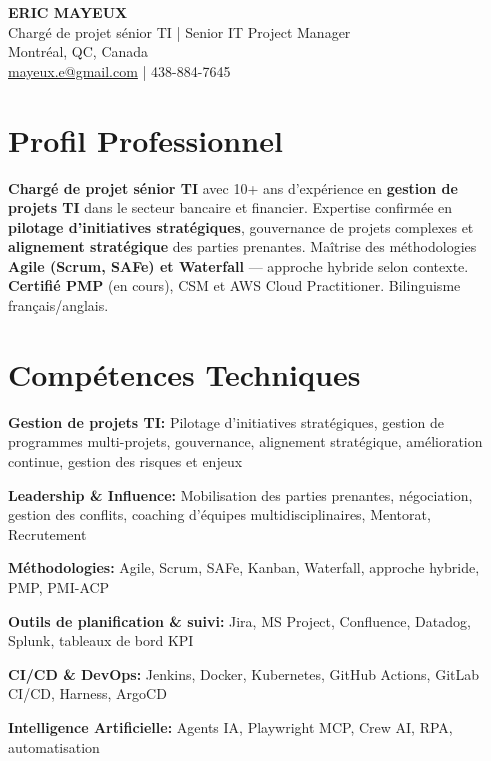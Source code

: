\documentclass[11pt,a4paper]{article}
\begin{document}
\begin{center}
    {\LARGE \textbf{ERIC MAYEUX}}\\
    \vspace{4pt}
    {\large Chargé de projet sénior TI | Senior IT Project Manager}\\
    \vspace{4pt}
    Montréal, QC, Canada\\
    \href{mailto:mayeux.e@gmail.com}{mayeux.e@gmail.com} | 438-884-7645
\end{center}

\vspace{8pt}

\section*{Profil Professionnel}
\noindent
\textbf{Chargé de projet sénior TI} avec 10+ ans d'expérience en \textbf{gestion de projets TI} dans le secteur bancaire et financier. Expertise confirmée en \textbf{pilotage d'initiatives stratégiques}, gouvernance de projets complexes et \textbf{alignement stratégique} des parties prenantes. Maîtrise des méthodologies \textbf{Agile (Scrum, SAFe) et Waterfall} — approche hybride selon contexte. \textbf{Certifié PMP} (en cours), CSM et AWS Cloud Practitioner. Bilinguisme français/anglais.

\section*{Compétences Techniques}

\textbf{Gestion de projets TI:} Pilotage d'initiatives stratégiques, gestion de programmes multi-projets, gouvernance, alignement stratégique, amélioration continue, gestion des risques et enjeux

\textbf{Leadership \& Influence:} Mobilisation des parties prenantes, négociation, gestion des conflits, coaching d'équipes multidisciplinaires, Mentorat, Recrutement

\textbf{Méthodologies:} Agile, Scrum, SAFe, Kanban, Waterfall, approche hybride, PMP, PMI-ACP

\textbf{Outils de planification \& suivi:} Jira, MS Project, Confluence, Datadog, Splunk, tableaux de bord KPI

\textbf{CI/CD \& DevOps:} Jenkins, Docker, Kubernetes, GitHub Actions, GitLab CI/CD, Harness, ArgoCD

\textbf{Intelligence Artificielle:} Agents IA, Playwright MCP, Crew AI, RPA, automatisation
\end{document}
